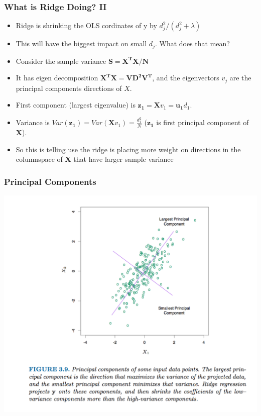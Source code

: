 \begin{frame}
    \frametitle{What is Ridge Doing? II}
    \begin{itemize}
        \item Ridge is shrinking the OLS cordinates of y by $d_j^2/(d_j^2 + \lambda)$
        \item This will have the biggest impact on small $d_j$. What does that mean? 
        \item Consider the sample variance $\mathbf{S=X^TX/N}$ 
        \item It has eigen decomposition $\mathbf{X^TX = VD^2V^T}$, and the eigenvectors $v_j$ are the \alert{principal components} directions of $X$. 
        \item First component (largest eigenvalue) is $\mathbf{z_1} = \mathbf{X} v_1 = \mathbf{u_1} d_1$.
        \item Variance is $Var(\mathbf{z_1}) = Var (\mathbf{X} v_1) = \frac{d_1^2}{N}$ ($\mathbf{z_1}$ is first principal component of $\mathbf{X}$).
        \item So this is telling use the ridge is placing more weight on directions in the columnspace of $\mathbf{X}$ that have larger sample variance 
     \end{itemize}
\end{frame} 

\begin{frame}
   \frametitle{Principal Components}
   \vspace{-10pt}
    \begin{center}
    \includegraphics[width=\textwidth]{./resources/princompfig}
    \end{center}
\end{frame}
    
